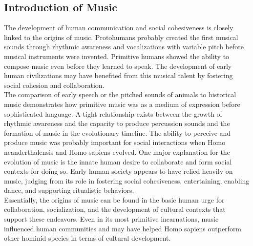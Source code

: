 
\subsection{Introduction of Music}
The development of human communication and social cohesiveness is closely linked to the origins of music. 
Protohumans probably created the first musical sounds through rhythmic awareness and vocalizations with variable pitch before musical instruments were invented. 
Primitive humans showed the ability to compose music even before they learned to speak. 
The development of early human civilizations may have benefited from this musical talent by fostering social cohesion and collaboration.
\\
\indent The comparison of early speech or the pitched sounds of animals to historical music demonstrates how primitive music was as a medium of expression before sophisticated language. 
A tight relationship exists between the growth of rhythmic awareness and the capacity to produce percussion sounds and the formation of music in the evolutionary timeline.
The ability to perceive and produce music was probably important for social interactions when Homo neanderthalensis and Homo sapiens evolved.
One major explanation for the evolution of music is the innate human desire to collaborate and form social contexts for doing so. 
Early human society appears to have relied heavily on music, judging from its role in fostering social cohesiveness, entertaining, enabling dance, and supporting ritualistic behaviors.
\\
\indent Essentially, the origins of music can be found in the basic human urge for collaboration, socialization, and the development of cultural contexts that support these endeavors. 
Even in its most primitive incarnations, music influenced human communities and may have helped Homo sapiens outperform other hominid species in terms of cultural development.

